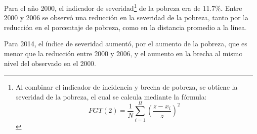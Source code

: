 Para el año 2000, el indicador de severidad\footnote{Al combinar el indicador de incidencia y brecha de pobreza, se obtiene la severidad de la pobreza, el cual se calcula mediante la fórmula: 
	\[ FGT(2)  =\frac {1} {N} \sum_{i=1}^H \left(\frac {z-x_i} {z}\right)^2  \] } de la pobreza era de 11.7\%. 
Entre 2000 y 2006 se observó una reducción en la severidad de la pobreza, tanto por la reducción en el porcentaje de pobreza, como en la distancia promedio a la línea. 

Para 2014, el índice de severidad aumentó, por el aumento de la pobreza, que es menor que la reducción entre 2000 y 2006, y el aumento en la brecha al mismo nivel del observado en el 2000.